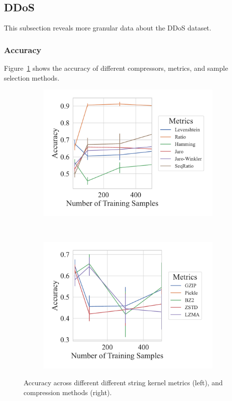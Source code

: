 \subsection{DDoS}
This subsection reveals more granular data about the DDoS dataset.

\subsubsection{Accuracy}
Figure~\ref{fig:ddos_accuracy} shows the accuracy of different compressors, metrics, and sample selection methods.

\begin{figure}[h!]
	\centering
    \captionsetup[subfigure]{skip=0pt}
	\begin{subfigure}[t]{.44\textwidth}
		\centering
		\includegraphics[width=\textwidth]{figs/ddos/string_metric_vs_accuracy.pdf}
	\end{subfigure}
	~
	\begin{subfigure}[t]{.44\textwidth}
		\centering
		\includegraphics[width=\textwidth]{figs/ddos/compressor_metric_vs_accuracy.pdf}
	\end{subfigure}
	\caption{Accuracy across different different string kernel metrics (left), and compression methods (right).}
	\label{fig:ddos_accuracy}
\end{figure}

